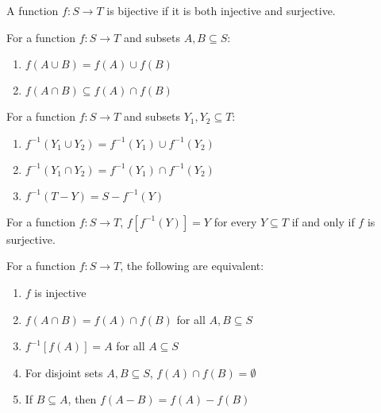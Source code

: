 \begin{definition}
A function $f: S \to T$ is bijective if it is both injective and surjective.
\end{definition}

\begin{theorem}
For a function $f: S \to T$ and subsets $A, B \subseteq S$:
\begin{enumerate}
\item $f(A \cup B) = f(A) \cup f(B)$
\item $f(A \cap B) \subseteq f(A) \cap f(B)$
\end{enumerate}
\end{theorem}

\begin{theorem}
For a function $f: S \to T$ and subsets $Y_1, Y_2 \subseteq T$:
\begin{enumerate}
\item $f^{-1}(Y_1 \cup Y_2) = f^{-1}(Y_1) \cup f^{-1}(Y_2)$
\item $f^{-1}(Y_1 \cap Y_2) = f^{-1}(Y_1) \cap f^{-1}(Y_2)$
\item $f^{-1}(T - Y) = S - f^{-1}(Y)$
\end{enumerate}
\end{theorem}

\begin{theorem}
For a function $f: S \to T$, $f[f^{-1}(Y)] = Y$ for every $Y \subseteq T$ if and only if $f$ is surjective.
\end{theorem}

\begin{theorem}
For a function $f: S \to T$, the following are equivalent:
\begin{enumerate}
\item $f$ is injective
\item $f(A \cap B) = f(A) \cap f(B)$ for all $A, B \subseteq S$
\item $f^{-1}[f(A)] = A$ for all $A \subseteq S$
\item For disjoint sets $A, B \subseteq S$, $f(A) \cap f(B) = \emptyset$
\item If $B \subseteq A$, then $f(A - B) = f(A) - f(B)$
\end{enumerate}
\end{theorem}

